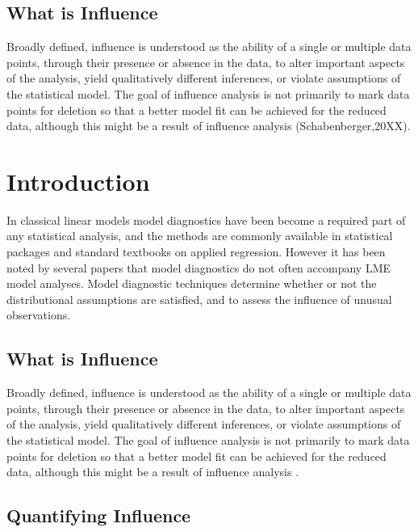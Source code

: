 \documentclass[Main.tex]{subfiles}
\begin{document}
	
	\subsection{What is Influence} %
	
	Broadly defined, influence is understood as the ability of a single or multiple data points, through their presence or absence in the data, to alter important aspects of the analysis, yield qualitatively different inferences, or violate assumptions of the statistical model. The goal of influence analysis is not primarily to mark data
	points for deletion so that a better model fit can be achieved for the reduced data, although this might be a result of influence analysis (Schabenberger,20XX).
	




	\section{Introduction}%
	In classical linear models model diagnostics have been become a required part of any statistical analysis, and the methods are commonly available in statistical packages and standard textbooks on applied regression. However it has been noted by several papers that model diagnostics do not often accompany LME model analyses.
	Model diagnostic techniques determine whether or not the distributional assumptions are satisfied, and to assess the influence of unusual observations.
	
	\subsection{What is Influence} %
	
	
	Broadly defined, influence is understood as the ability of a single or multiple data points, through their presence or absence in the data, to alter important aspects of the analysis, yield qualitatively different inferences, or violate assumptions of the statistical model. The goal of influence analysis is not primarily to mark data
	points for deletion so that a better model fit can be achieved for the reduced data, although this might be a result of influence analysis \citep{schabenberger}.
	
	
	\subsection{Quantifying Influence}  %
	
\end{document}
